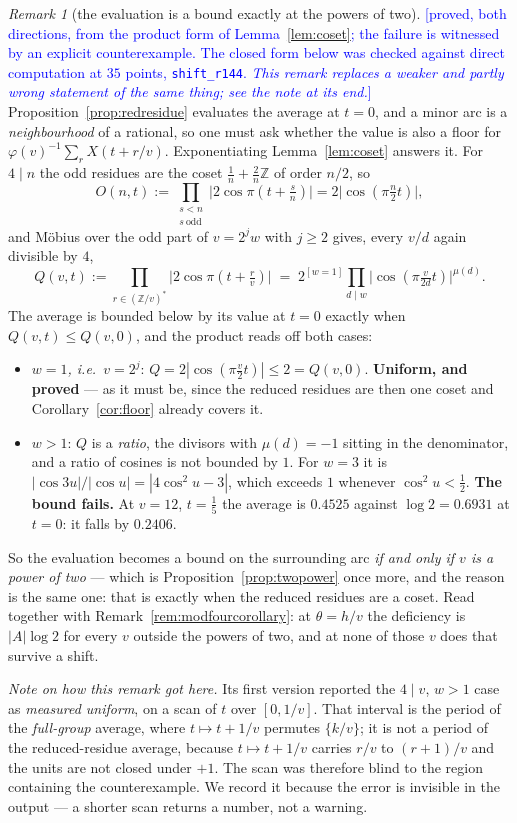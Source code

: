 \documentclass[11pt,a4paper]{article}
\theoremstyle{plain}
\theoremstyle{definition}
\theoremstyle{remark}
\newtheorem{remark}[theorem]{Remark}
\newcommand{\STATUS}[1]{\textcolor{blue}{\textsf{[#1]}}}
\begin{document}
\begin{remark}[the evaluation is a bound exactly at the powers of two]\label{rem:shift}
\STATUS{proved, both directions, from the product form of Lemma~\ref{lem:coset}; the failure is
witnessed by an explicit counterexample. The closed form below was checked against direct
computation at $35$ points, \texttt{shift\_r144}. \emph{This remark replaces a weaker and partly
wrong statement of the same thing; see the note at its end.}}
Proposition~\ref{prop:redresidue} evaluates the average at $t=0$, and a minor arc is a
\emph{neighbourhood} of a rational, so one must ask whether the value is also a floor for
$\varphi(v)^{-1}\sum_{r}X(t+r/v)$. Exponentiating Lemma~\ref{lem:coset} answers it. For
$4\mid n$ the odd residues are the coset $\tfrac1n+\tfrac2n\mathbb{Z}$ of order $n/2$, so
\[
  O(n,t):=\prod_{\substack{s<n\\ s\ \mathrm{odd}}}\bigl|2\cos\pi(t+\tfrac sn)\bigr|
        = 2\bigl|\cos(\pi\tfrac n2 t)\bigr|,
\]
and M\"obius over the odd part of $v=2^{j}w$ with $j\ge2$ gives, every $v/d$ again divisible
by $4$,
\[
  Q(v,t):=\prod_{r\in(\mathbb{Z}/v)^{*}}\bigl|2\cos\pi(t+\tfrac rv)\bigr|
  \;=\;2^{[w=1]}\prod_{d\mid w}\bigl|\cos(\pi\tfrac{v}{2d}t)\bigr|^{\mu(d)} .
\]
The average is bounded below by its value at $t=0$ exactly when $Q(v,t)\le Q(v,0)$, and the
product reads off both cases:
\begin{itemize}
\item \emph{$w=1$, i.e.\ $v=2^{j}$}: $Q=2|\cos(\pi\tfrac v2t)|\le2=Q(v,0)$. \textbf{Uniform, and
      proved} --- as it must be, since the reduced residues are then one coset and
      Corollary~\ref{cor:floor} already covers it.
\item \emph{$w>1$}: $Q$ is a \emph{ratio}, the divisors with $\mu(d)=-1$ sitting in the
      denominator, and a ratio of cosines is not bounded by $1$. For $w=3$ it is
      $|\cos3u|/|\cos u|=|4\cos^{2}u-3|$, which exceeds $1$ whenever $\cos^{2}u<\tfrac12$.
      \textbf{The bound fails.} At $v=12$, $t=\tfrac15$ the average is $0.4525$ against
      $\log2=0.6931$ at $t=0$: it falls by $0.2406$.
\end{itemize}
So the evaluation becomes a bound on the surrounding arc \emph{if and only if $v$ is a power of
two} --- which is Proposition~\ref{prop:twopower} once more, and the reason is the same one:
that is exactly when the reduced residues are a coset. Read together with
Remark~\ref{rem:modfourcorollary}: at $\theta=h/v$ the deficiency is $|A|\log2$ for every $v$
outside the powers of two, and at none of those $v$ does that survive a shift.

\emph{Note on how this remark got here.} Its first version reported the $4\mid v$, $w>1$ case as
\emph{measured uniform}, on a scan of $t$ over $[0,1/v]$. That interval is the period of the
\emph{full-group} average, where $t\mapsto t+1/v$ permutes $\{k/v\}$; it is not a period of the
reduced-residue average, because $t\mapsto t+1/v$ carries $r/v$ to $(r+1)/v$ and the units are
not closed under $+1$. The scan was therefore blind to the region containing the counterexample.
We record it because the error is invisible in the output --- a shorter scan returns a number,
not a warning.
\end{remark}
\end{document}
